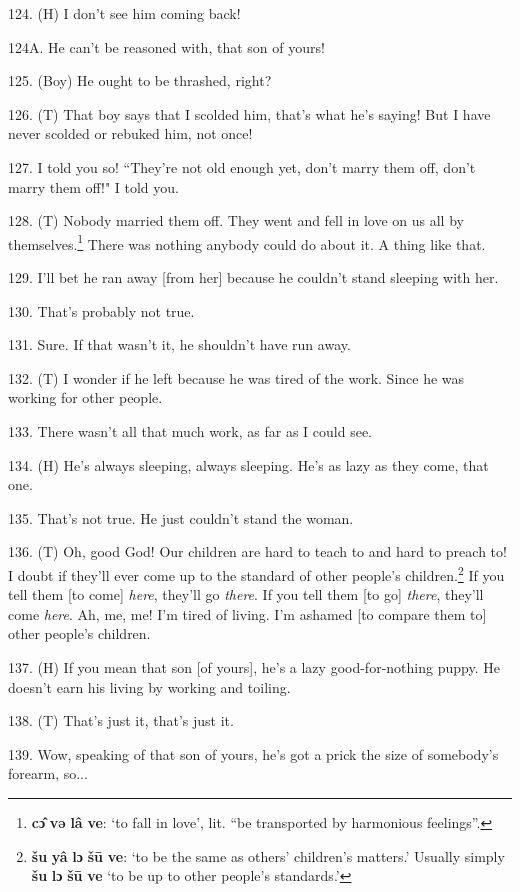 124. (H) I don't see him coming back!

124A. He can't be reasoned with, that son of yours!

125. (Boy) He ought to be thrashed, right?

126. (T) That boy says that I scolded him, that's what he's saying! But I have
never scolded or rebuked him, not once!

127. I told you so! ``They're not old enough yet, don't marry them off,
don't marry them off!" I told you.

128. (T) Nobody married them off. They went and fell in love on us all by themselves.\footnote{\textbf{cɔ̂} \textbf{və} \textbf{lâ} \textbf{ve}: `to fall in love', lit. ``be transported by harmonious feelings''.}
There was nothing anybody could do about it. A thing like that.

129. I'll bet he ran away [from her] because he couldn't stand sleeping with her.

130. That's probably not true.

131. Sure. If that wasn't it, he shouldn't have run away.

132. (T) I wonder if he left because he was tired of the work. Since he was working
for other people.

133. There wasn't all that much work, as far as I could see.

134. (H) He's always sleeping, always sleeping. He's as lazy as they come, that
one.

135. That's not true. He just couldn't stand the woman.

136. (T) Oh, good God! Our children are hard to teach to and hard to preach to!
I doubt if they'll ever come up to the standard of other people's children.\footnote{\textbf{šu} \textbf{yâ} \textbf{lɔ} \textbf{šū} \textbf{ve}: `to be the same as others' children's matters.' Usually simply \textbf{šu} \textbf{lɔ} \textbf{šū} \textbf{ve} `to be up to other people's standards.'}
If you tell them [to come] \textit{here}, they'll go \textit{there}. If you tell
them [to go] \textit{there}, they'll come \textit{here}. Ah, me, me! I'm tired
of living. I'm ashamed [to compare them to] other people's children.

137. (H) If you mean that son [of yours], he's a lazy good-for-nothing puppy. He
doesn't earn his living by working and toiling.

138. (T) That's just it, that's just it.

139. Wow, speaking of that son of yours, he's got a prick the size of somebody's
forearm, so...

